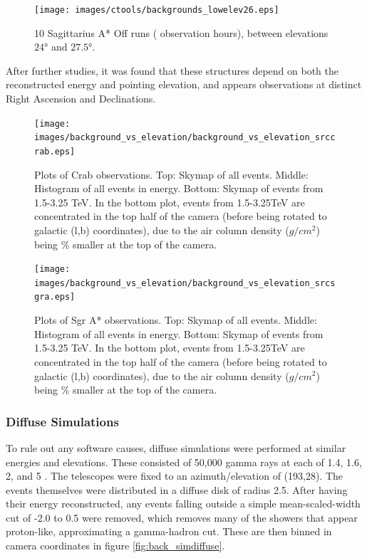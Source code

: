    \begin{figure}[ht]
      \begin{center}
        \texttt{[image: images/ctools/backgrounds\_lowelev26.eps]}
        \caption[CTOOLS Background at 26\degree Elevation]{10 Sagittarius A* Off runs ( observation hours), between elevations $ \ang{24} $ and $ \ang{27.5} $. }\label{fig:back_lowelev26}
      \end{center}
    \end{figure}
  
  After further studies, it was found that these structures depend on both the reconstructed energy and pointing elevation, and appears observations at distinct Right Ascension and Declinations.
  
  \begin{figure}[ht]
    \centering
    \texttt{[image: images/background\_vs\_elevation/background\_vs\_elevation\_srccrab.eps]}
    \caption[Background Vs Elevation Crab]
    {\small 
      Plots of Crab observations.
      Top: Skymap of all events.  Middle: Histogram of all events in energy.  Bottom: Skymap of events from 1.5-3.25 TeV.  
      In the bottom plot, events from 1.5-3.25TeV are concentrated in the top half of the camera (before being rotated to galactic (l,b) coordinates), due to the air column density ($g/cm^2$) being \% smaller at the top of the camera.
    }
    \label{fig:bkgvsel_crab}
  \end{figure}

  \begin{figure}[ht]
    \centering
    \texttt{[image: images/background\_vs\_elevation/background\_vs\_elevation\_srcsgra.eps]}
    \caption[Background Vs Elevation Sgr A*]
    {\small 
      Plots of Sgr A* observations.
      Top: Skymap of all events.  Middle: Histogram of all events in energy.  Bottom: Skymap of events from 1.5-3.25 TeV.  
      In the bottom plot, events from 1.5-3.25TeV are concentrated in the top half of the camera (before being rotated to galactic (l,b) coordinates), due to the air column density ($g/cm^2$) being \% smaller at the top of the camera.
    }
    \label{fig:bkgvsel_sgra}
  \end{figure}
  
  

  \subsubsection{Diffuse Simulations}\label{subsubsec:diffusesims}
    To rule out any software causes, diffuse simulations were performed at similar energies and elevations.
    These consisted of 50,000 gamma rays at each of 1.4, 1.6, 2, and 5 \TeV.
    The telescopes were fixed to an azimuth/elevation of (193\degree,28\degree).
    The events themselves were distributed in a diffuse disk of radius 2.5\degree.
    After having their energy reconstructed, any events falling outside a simple mean-scaled-width cut of -2.0 to 0.5 were removed, which removes many of the showers that appear proton-like, approximating a gamma-hadron cut.
    These are then binned in camera coordinates in figure \ref{fig:back_simdiffuse}.

